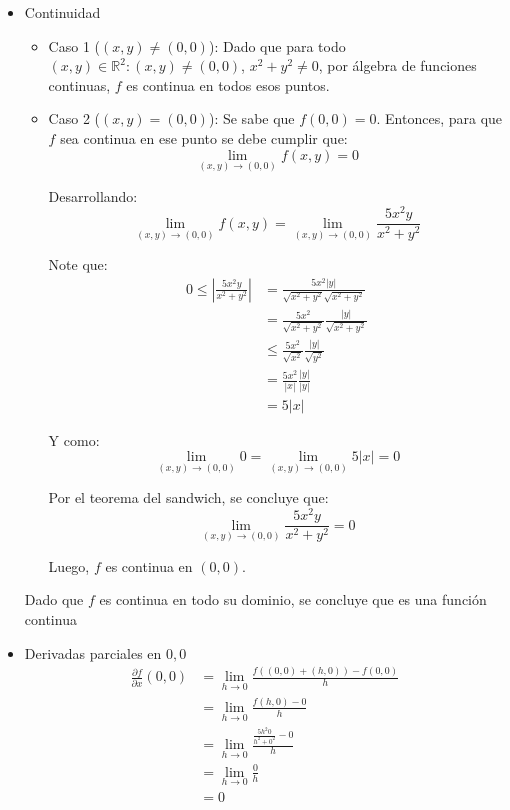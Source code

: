 \documentclass{article}
\newcommand{\R}{\mathbb{R}}
\begin{document}
\begin{itemize}
  \item Continuidad
  
  \begin{itemize}
    \item Caso 1 ($(x, y) \neq (0, 0)$):
      Dado que para todo $(x, y) \in \R^2 : (x, y) \neq (0, 0)$, $x^2 + y^2 \neq 0$, por álgebra de funciones continuas, $f$ es continua en todos esos puntos.

    \item Caso 2 ($(x, y) = (0, 0)$):
      Se sabe que $f(0, 0) = 0$. Entonces, para que $f$ sea continua en ese punto se debe cumplir que:
      \[
        \lim_{(x, y) \to (0, 0)} f(x, y) = 0
      \]

      Desarrollando:
      \[
        \lim_{(x, y) \to (0, 0)} f(x, y) = \lim_{(x, y) \to (0, 0)} \frac{5x^2y}{x^2 + y^2}
      \]

      Note que:
      \begin{align*}
      0 \leq \left| \frac{5x^2y}{x^2 + y^2} \right| &= \frac{5x^2 \left| y \right|}{\sqrt{x^2 + y^2} \sqrt{x^2 + y^2}} \\ &= \frac{5x^2}{\sqrt{x^2 + y^2} }\frac{\left| y \right|}{\sqrt{x^2 + y^2}} \\ 
      &\leq \frac{5x^2}{\sqrt{x^2} }\frac{\left| y \right|}{\sqrt{y^2}} \\
      &= \frac{5x^2}{\left|x\right|}\frac{\left| y \right|}{\left|y\right|} \\
      &= 5\left|x\right|
      \end{align*}

      Y como:
      \[
        \lim_{(x, y) \to (0, 0)} 0 = \lim_{(x, y) \to (0, 0)} 5 \left|x\right| = 0
      \]

      Por el teorema del sandwich, se concluye que:
      \[
      \lim_{(x, y) \to (0, 0)} \frac{5x^2y}{x^2 + y^2} = 0
      \]

      Luego, $f$ es continua en $(0, 0)$.
  \end{itemize}

  Dado que $f$ es continua en todo su dominio, se concluye que es una función continua
  
  
  \item Derivadas parciales en $0, 0$
    \begin{align*}
      \frac{\partial f}{\partial x}(0, 0) &= \lim_{h \to 0} \frac{f((0, 0) + (h, 0)) - f(0, 0)}{h} \\
      &= \lim_{h \to 0} \frac{f(h, 0) - 0}{h} \\
      &= \lim_{h \to 0} \frac{\frac{5h^2 0}{h^2 + 0^2} - 0}{h} \\
      &= \lim_{h \to 0} \frac{0}{h} \\
      &= 0
    \end{align*}


\end{itemize}
\end{document}
